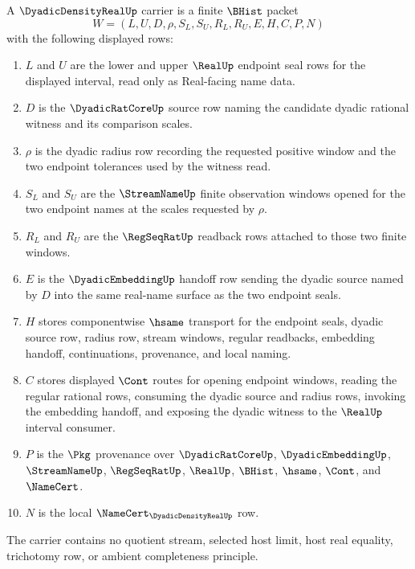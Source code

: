 \begin{definition}
\label{def:dyadic-density-real-carrier}
A $\DyadicDensityRealUp$ carrier is a finite $\BHist$ packet
$$
W=(L,U,D,\rho,S_L,S_U,R_L,R_U,E,H,C,P,N)
$$
with the following displayed rows:
\begin{enumerate}
\item $L$ and $U$ are the lower and upper $\RealUp$ endpoint seal rows for the
displayed interval, read only as Real-facing name data.
\item $D$ is the $\DyadicRatCoreUp$ source row naming the candidate dyadic
rational witness and its comparison scales.
\item $\rho$ is the dyadic radius row recording the requested positive window
and the two endpoint tolerances used by the witness read.
\item $S_L$ and $S_U$ are the $\StreamNameUp$ finite observation windows
opened for the two endpoint names at the scales requested by $\rho$.
\item $R_L$ and $R_U$ are the $\RegSeqRatUp$ readback rows attached to those
two finite windows.
\item $E$ is the $\DyadicEmbeddingUp$ handoff row sending the dyadic source
named by $D$ into the same real-name surface as the two endpoint seals.
\item $H$ stores componentwise $\hsame$ transport for the endpoint seals,
dyadic source row, radius row, stream windows, regular readbacks, embedding
handoff, continuations, provenance, and local naming.
\item $C$ stores displayed $\Cont$ routes for opening endpoint windows, reading
the regular rational rows, consuming the dyadic source and radius rows,
invoking the embedding handoff, and exposing the dyadic witness to the
$\RealUp$ interval consumer.
\item $P$ is the $\Pkg$ provenance over $\DyadicRatCoreUp$,
$\DyadicEmbeddingUp$, $\StreamNameUp$, $\RegSeqRatUp$, $\RealUp$, $\BHist$,
$\hsame$, $\Cont$, and $\NameCert$.
\item $N$ is the local $\NameCert_{\DyadicDensityRealUp}$ row.
\end{enumerate}
The carrier contains no quotient stream, selected host limit, host real
equality, trichotomy row, or ambient completeness principle.
\end{definition}

